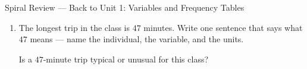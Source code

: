 \documentclass[12pt]{article}
\begin{document}
\begin{notesbox}{Spiral Review --- Back to Unit 1: Variables and Frequency Tables}
\begin{enumerate}[leftmargin=1.8em, itemsep=22pt, topsep=10pt]
        \vspace{8pt}
        How many students in all? \par\vspace{4pt}
        How many take $20$ minutes or more? 

        \vspace{8pt}
        What \textbf{percent} of the class takes less than $10$ minutes?

        \begin{work}
           = 0.35 = 35\%
        \end{work}

  \item The longest trip in the class is $47$ minutes. Write one sentence that says what $47$
        means --- name the individual, the variable, and the units.
        \par{}

        \vspace{6pt}
        Is a $47$-minute trip typical or unusual for this class? 

\end{enumerate}
\end{notesbox}
\end{document}
